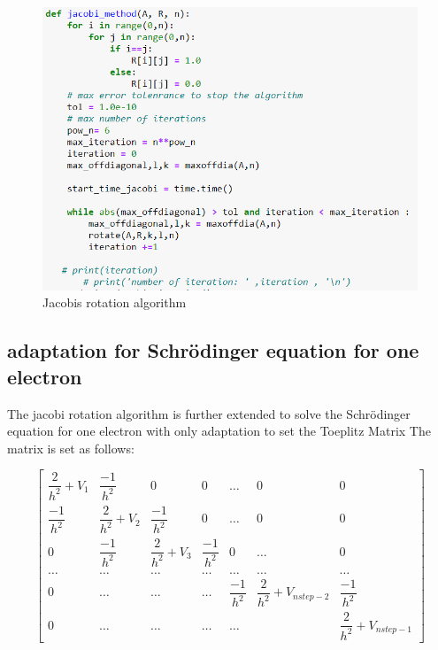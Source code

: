 \documentclass{article}
\newcommand{\SL}{Schr\"{o}dinger }
\begin{document}
\begin{figure}[H]
  \includegraphics[width=\linewidth]{jacobialg.png}
  \caption{Jacobis rotation algorithm}
  \label{fig:jacobialg}
\end{figure}

\subsection{adaptation for Schrödinger equation for one electron}
The jacobi rotation algorithm is further extended to solve the \SL equation for one electron with only adaptation to set the Toeplitz Matrix 
The matrix is set as follows:


\begin{equation}
    \begin{bmatrix} \dfrac{2}{h^2}+V_1& \dfrac{-1}{h^2} & 0   & 0    & \dots  &0     & 0 \\
                                \dfrac{-1}{h^2} & \dfrac{2}{h^2}+V_2 & \dfrac{-1}{h^2} & 0    & \dots  &0     &0 \\
                                0   & \dfrac{-1}{h^2} & \dfrac{2}{h^2}+V_3 & \dfrac{-1}{h^2}  &0       &\dots & 0\\
                                \dots  & \dots & \dots & \dots  &\dots      &\dots & \dots\\
                                0   & \dots & \dots & \dots  &\dfrac{-1}{h^2}  &\dfrac{2}{h^2}+V_{nstep-2} & \dfrac{-1}{h^2}\\
                                0   & \dots & \dots & \dots  &\dots       & & \dfrac{2}{h^2}+V_{nstep-1}\end{bmatrix}
\label{eq:sc1matrixse}
\end{equation}
                            
\end{document}
